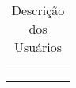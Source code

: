 \begin{table}[H]
\begin{tabular}{lllll}
		\textbf{}                              &                                                                                                                                                                                                                                                                                                                                                                                             &           &  &  \\
		\textbf{}                              &                                                                                                                                                                                                                                                                                                                                                                                             &           &  &  \\
		\textbf{}                              &                                                                                                                                                                                                                                                                                                                                                                                             &           &  & 
		\end{tabular}
		\caption{Descrição dos Usuários}
\end{table}